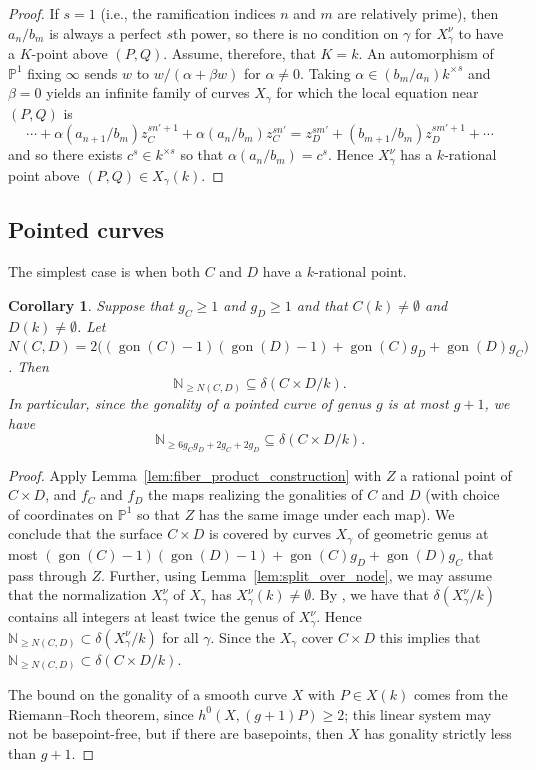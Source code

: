 \documentclass[a4paper,11pt]{amsart}
\theoremstyle{plain}
\newtheorem{coroll}[thm]{Corollary}
\theoremstyle{remark}
\newcommand{\nn}{\mathbb{N}}
\renewcommand{\P}{\mathbb{P}}
\newcommand{\dendegs}{\delta}
\newcommand{\gon}{\operatorname{gon}}
\begin{document}
\begin{proof}
    If \(s= 1\) (i.e., the ramification indices \(n\) and \(m\) are relatively prime), then \(a_n/b_m\) is always a perfect \(s\)th power, so there is no condition on \(\gamma\) for \(X_\gamma^\nu\) to have a \(K\)-point above \((P,Q)\).  Assume, therefore, that \(K = k\). 
    An automorphism of \(\P^1\) fixing \(\infty\) sends \(w\) to \(w/(\alpha + \beta w)\) for \(\alpha \neq 0\).  Taking \(\alpha \in (b_m/a_n){k^\times}^s\) and \(\beta=0\) yields an infinite family of curves \(X_\gamma\) for which the local equation near \((P,Q)\) is 
    \[\cdots + \alpha (a_{n+1}/b_m)z_C^{sn'+1} + \alpha (a_n/b_m)z_C^{sn'} = z_D^{sm'} + (b_{m+1}/b_m)z_D^{sm'+1} + \cdots\] 
    and so there exists \(c^s \in k^{\times s}\) so that \(\alpha (a_n/b_m) = c^s\).  Hence \(X_\gamma^\nu\) has a \(k\)-rational point above \((P,Q) \in X_\gamma(k)\).
\end{proof}

\subsection{Pointed curves}  The simplest case is when both \(C\) and \(D\) have a \(k\)-rational point.

\begin{coroll}\label{coroll:inclusionofN(C,D)}
     Suppose that \(g_C\geq 1\) and \(g_D \geq 1\) and that \(C(k) \neq \emptyset\) and \(D(k) \neq \emptyset\).  Let \(N(C, D) = 2 \big((\gon(C)-1)(\gon(D)-1) + \gon(C)g_D + \gon(D)g_C\big)\). Then 
     \[ \nn_{\geq N(C, D)} \subseteq \dendegs(C \times D/k).\]
     In particular, since the gonality of a pointed curve of genus \(g\) is at most \(g+1\), we have
     \[ \nn_{\geq 6g_Cg_D + 2g_C + 2g_D} \subseteq \dendegs(C \times D/k).\]
\end{coroll}
\begin{proof}
    Apply Lemma~\ref{lem:fiber_product_construction} with \(Z\) a rational point of \(C \times D\), and \(f_C\) and \(f_D\) the maps realizing the gonalities of \(C\) and \(D\) (with choice of coordinates on \(\P^1\) so that \(Z\) has the same image under each map).  We conclude that the surface \(C \times D\) is covered by curves \(X_\gamma\) of geometric genus at most \((\gon(C)-1)(\gon(D)-1) + \gon(C)g_D + \gon(D)g_C\) that pass through \(Z\). 
 Further, using Lemma~\ref{lem:split_over_node}, we may assume that the normalization \(X_\gamma^\nu\) of \(X_\gamma\) has \(X_\gamma^\nu(k) \neq \emptyset\).  By \cite[Proposition 5.1.1]{VV}, we have that \(\dendegs(X_\gamma^\nu/k)\) contains all integers at least twice the genus of \(X_\gamma^\nu\).  Hence 
 \(\nn_{\geq N(C, D)} \subset \dendegs(X_\gamma^\nu/k)\) for all \(\gamma\).  Since the \(X_\gamma\) cover \(C \times D\) this implies that \(\nn_{\geq N(C, D)} \subset \dendegs(C \times D/k)\).

 The bound on the gonality of a smooth curve \(X\) with \(P \in X(k)\) comes from the Riemann--Roch theorem, since \(h^0(X, (g+1)P) \geq 2\); this linear system may not be basepoint-free, but if there are basepoints, then \(X\) has gonality strictly less than \(g+1\).
\end{proof}
\end{document}
